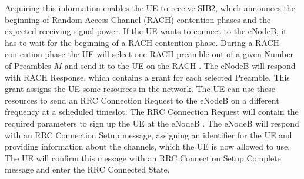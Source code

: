 \documentclass[conference]{IEEEtran}
\begin{document}
Acquiring this information enables the UE to receive SIB2, which announces the beginning of Random Access Channel (RACH) contention phases and the expected receiving signal power.
If the UE wants to connect to the eNodeB, it has to wait for the beginning of a RACH contention phase.
During a RACH contention phase the UE will select one RACH preamble out of a given Number of Preambles $M$ and send it to the UE on the RACH .
The eNodeB will respond with RACH Response, which contains a grant for each selected Preamble.
This grant assigns the UE some resources in the network.
The UE can use these resources to send an RRC Connection Request to the eNodeB on a different frequency at a scheduled timeslot.
The RRC Connection Request will contain the required parameters to sign up the UE at the eNodeB .
The eNodeB will respond with an RRC Connection Setup message, assigning an identifier for the UE and providing information about the channels, which the UE is now allowed to use.
The UE will confirm this message with an RRC Connection Setup Complete message and enter the RRC Connected State.
\end{document}
